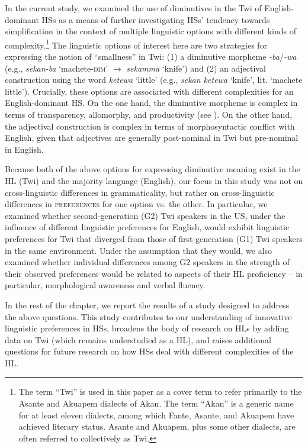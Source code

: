 \documentclass[output=paper,colorlinks,citecolor=brown]{langscibook}
\begin{document}
In the current study, we examined the use of diminutives in the Twi of English-dominant HSs as a means of further investigating HSs' tendency towards simplification in the context of multiple linguistic options with different kinds of complexity.\footnote{The term ``Twi'' is used in this paper as a cover term to refer primarily to the Asante and Akuapem dialects of Akan. The term ``Akan'' is a generic name for at least eleven dialects, among which Fante, Asante, and Akuapem have achieved literary status. Asante and Akuapem, plus some other dialects, are often referred to collectively as Twi.} The linguistic options of interest here are two strategies for expressing the notion of ``smallness'' in Twi: (1) a diminutive morpheme \textit{-ba}/\textit{-wa} (e.g., \textit{sekan-ba} `machete-\textsc{dim}' $\rightarrow$ \textit{sekamma} `knife') and (2) an adjectival construction using the word \textit{ketewa} `little' (e.g., \textit{sekan ketewa} `knife', lit. `machete little'). Crucially, these options are associated with different complexities for an English-dominant HS. On the one hand, the diminutive morpheme is complex in terms of transparency, allomorphy, and productivity (see ). On the other hand, the adjectival construction is complex in terms of morphosyntactic conflict with English, given that adjectives are generally post-nominal in Twi but pre-nominal in English.

Because both of the above options for expressing diminutive meaning exist in the HL (Twi) and the majority language (English), our focus in this study was not on cross-linguistic differences in grammaticality, but rather on cross-linguistic differences in \textsc{preferences} for one option vs. the other. In particular, we examined whether second-generation (G2) Twi speakers in the US, under the influence of different linguistic preferences for English, would exhibit linguistic preferences for Twi that diverged from those of first-generation (G1) Twi speakers in the same environment. Under the assumption that they would, we also examined whether individual differences among G2 speakers in the strength of their observed preferences would be related to aspects of their HL proficiency -- in particular, morphological awareness and verbal fluency. 

In the rest of the chapter, we report the results of a study designed to address the above questions. This study contributes to our understanding of innovative linguistic preferences in HSs, broadens the body of research on HLs by adding data on Twi (which remains understudied as a HL), and raises additional questions for future research on how HSs deal with different complexities of the HL. 
\end{document}
